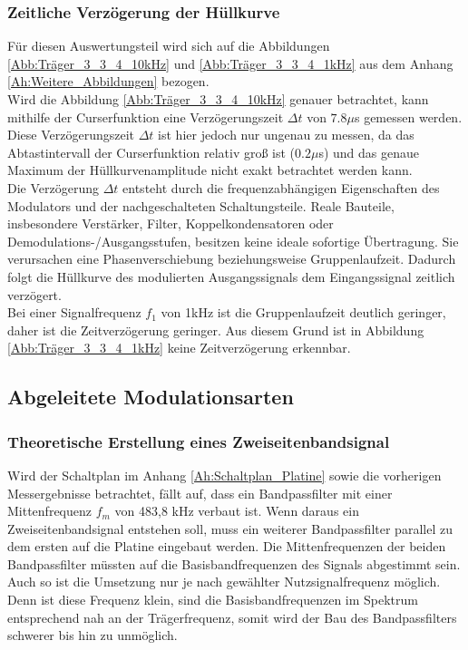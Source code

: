 \documentclass[12pt]{scrartcl}
\begin{document}
\subsubsection{Zeitliche Verzögerung der Hüllkurve}
Für diesen Auswertungsteil wird sich auf die Abbildungen \ref{Abb:Träger_3_3_4_10kHz} und \ref{Abb:Träger_3_3_4_1kHz} aus dem Anhang \ref{Ah:Weitere_Abbildungen} bezogen.\\
Wird die Abbildung \ref{Abb:Träger_3_3_4_10kHz} genauer betrachtet, kann mithilfe der Curserfunktion eine Verzögerungszeit $\Delta t$ von $7.8\mu$s gemessen werden.
Diese Verzögerungszeit $\Delta t$ ist hier jedoch nur ungenau zu messen, da das Abtastintervall der Curserfunktion relativ groß ist ($0.2\mu$s) und das genaue Maximum der Hüllkurvenamplitude nicht exakt betrachtet werden kann.\\
Die Verzögerung $\Delta t$ entsteht durch die frequenzabhängigen Eigenschaften des Modulators und der nachgeschalteten Schaltungsteile. 
Reale Bauteile, insbesondere Verstärker, Filter, Koppelkondensatoren oder Demodulations-/Ausgangsstufen, besitzen keine ideale sofortige Übertragung. 
Sie verursachen eine Phasenverschiebung beziehungsweise Gruppenlaufzeit. 
Dadurch folgt die Hüllkurve des modulierten Ausgangssignals dem Eingangssignal zeitlich verzögert.\\
Bei einer Signalfrequenz $f_1$ von 1kHz ist die Gruppenlaufzeit deutlich geringer, daher ist die Zeitverzögerung geringer.
Aus diesem Grund ist in Abbildung \ref{Abb:Träger_3_3_4_1kHz} keine Zeitverzögerung erkennbar.
\newpage
\subsection{Abgeleitete Modulationsarten}
\label{kap:4}
\subsubsection{Theoretische Erstellung eines  Zweiseitenbandsignal}
\label{kap:4.1}
Wird der Schaltplan im Anhang \ref{Ah:Schaltplan_Platine} sowie die vorherigen Messergebnisse betrachtet, fällt auf, dass ein Bandpassfilter mit einer Mittenfrequenz $f_m$ von 483,8 kHz verbaut ist. 
Wenn daraus ein Zweiseitenbandsignal entstehen soll, muss ein weiterer Bandpassfilter parallel zu dem ersten auf die Platine eingebaut werden. 
Die Mittenfrequenzen der beiden Bandpassfilter müssten auf die Basisbandfrequenzen des Signals abgestimmt sein.\\
Auch so ist die Umsetzung nur je nach gewählter Nutzsignalfrequenz möglich.
Denn ist diese Frequenz klein, sind die Basisbandfrequenzen im Spektrum entsprechend nah an der Trägerfrequenz, somit wird der Bau des Bandpassfilters schwerer bis hin zu unmöglich.
\end{document}
